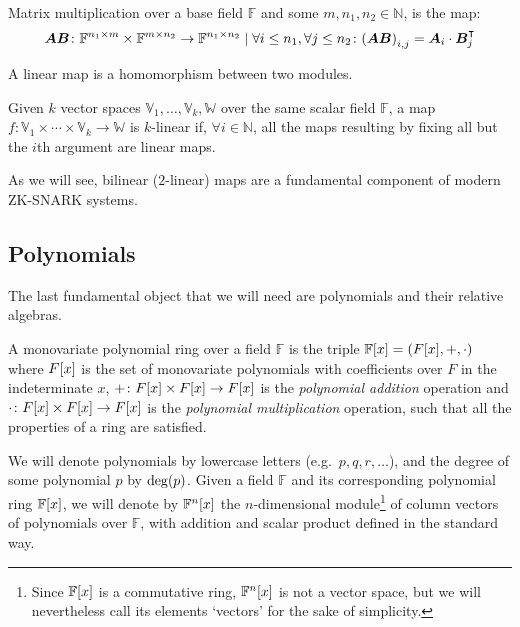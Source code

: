 \begin{definition}
  Matrix multiplication over a base field \(\mathbb{F}\) and some \(m, n_1, n_2 \in \mathbb{N}\), 
  is the map:
  \[
    \bm{A}\bm{B}\colon 
    \mathbb{F}^{n_1 \times m} \times \mathbb{F}^{m \times n_2} \to \mathbb{F}^{n_1 \times n_2} \mid 
    \forall i \le n_1, \forall j \le n_2\colon 
    \Parens*{\bm{A}\bm{B}}_{i,j} = \bm{A}_{i} \cdot \bm{B}^{\transpose}_{j}
  \] 
\end{definition}

\begin{definition}
   A linear map is a homomorphism between two modules.
\end{definition}
\begin{definition}
  Given \(k\) vector spaces \(\mathbb{V}_1, \dots, \mathbb{V}_k, \mathbb{W}\) over the same scalar 
  field \(\mathbb{F}\), a map 
  \(f\colon \mathbb{V}_1 \times \cdots \times \mathbb{V}_k \to \mathbb{W}\) 
  is \(k\)-linear if, \(\forall i \in \mathbb{N}\), all the maps resulting by fixing all but the 
  \(i\)th argument are linear maps.
\end{definition}

As we will see, bilinear (\(2\)-linear) maps are a fundamental component of modern ZK-SNARK systems.

\subsection{Polynomials}
The last fundamental object that we will need are polynomials and their relative algebras. 
\begin{definition}
  A monovariate polynomial ring over a field \(\mathbb{F}\) is the triple 
  \(\extend{\mathbb{F}}{x} = \Tuple{\extend{F}{x}, +, \cdot}\) where \(\extend{F}{x}\) is the set 
  of monovariate polynomials with coefficients over \(F\) in the indeterminate \(x\), 
  \(+\colon \extend{F}{x} \times \extend{F}{x} \to \extend{F}{x}\) is the \emph{polynomial addition}
  operation and \(\cdot\colon \extend{F}{x} \times \extend{F}{x} \to \extend{F}{x}\) is the
  \emph{polynomial multiplication} operation, such that all the properties of a ring are satisfied.
\end{definition}

We will denote polynomials by lowercase letters (e.g.\  \(p, q, r, \dots \)), and the degree of 
some polynomial \(p\) by \(\call{\deg}{p}\).
Given a field \(\mathbb{F}\) and its corresponding polynomial ring \(\extend{\mathbb{F}}{x}\), 
we will denote by \(\extend{\mathbb{F}^n}{x}\) the \(n\)-dimensional module\footnote{Since 
\(\extend{\mathbb{F}}{x}\) is a commutative ring, \(\extend{\mathbb{F}^n}{x}\) is not a vector 
space, but we will nevertheless call its elements `vectors' for the sake of simplicity.} of 
column vectors of polynomials over \(\mathbb{F}\), with addition and scalar product defined in the 
standard way.

